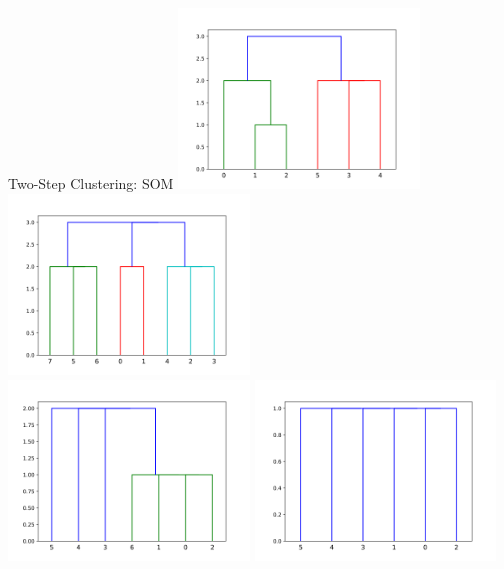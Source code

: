 \documentclass[rgb]{beamer}
\begin{document}
        \begin{frame}{Two-Step Clustering: SOM}
          \centering   \includegraphics[keepaspectratio,width=0.48\textwidth, height=0.48\textheight]{graphics/results_two_step/noise_0_som_dendro.png} \hspace{2cm}
             \includegraphics[keepaspectratio,width=0.48\textwidth, height=0.48\textheight]{graphics/results_two_step/noise_10_som_dendro.png} \\
             \includegraphics[keepaspectratio,width=0.48\textwidth, height=0.48\textheight]{graphics/results_two_step/noise_33_som_dendro.png} \hspace{2cm}
             \includegraphics[keepaspectratio,width=0.48\textwidth, height=0.48\textheight]{graphics/results_two_step/noise_50_som_dendro.png}
        \end{frame}{}
        
\end{document}
